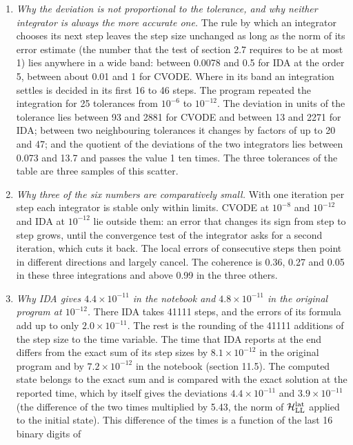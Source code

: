 \documentclass[
  10pt,
]{article}
\begin{document}
\begin{enumerate}
\item
  \emph{Why the deviation is not proportional to the tolerance, and why
  neither integrator is always the more accurate one.} The rule by which
  an integrator chooses its next step leaves the step size unchanged as
  long as the norm of its error estimate (the number that the test of
  section 2.7 requires to be at most 1) lies anywhere in a wide band:
  between 0.0078 and 0.5 for IDA at the order 5, between about 0.01 and
  1 for CVODE. Where in its band an integration settles is decided in
  its first 16 to 46 steps. The program repeated the integration for 25
  tolerances from \(10^{-6}\) to \(10^{-12}\). The deviation in units of
  the tolerance lies between 93 and 2881 for CVODE and between 13 and
  2271 for IDA; between two neighbouring tolerances it changes by
  factors of up to 20 and 47; and the quotient of the deviations of the
  two integrators lies between 0.073 and 13.7 and passes the value 1 ten
  times. The three tolerances of the table are three samples of this
  scatter.
\item
  \emph{Why three of the six numbers are comparatively small.} With one
  iteration per step each integrator is stable only within limits. CVODE
  at \(10^{-8}\) and \(10^{-12}\) and IDA at \(10^{-12}\) lie outside
  them: an error that changes its sign from step to step grows, until
  the convergence test of the integrator asks for a second iteration,
  which cuts it back. The local errors of consecutive steps then point
  in different directions and largely cancel. The coherence is 0.36,
  0.27 and 0.05 in these three integrations and above 0.99 in the three
  others.
\item
  \emph{Why IDA gives \(4.4\times10^{-11}\) in the notebook and
  \(4.8\times10^{-11}\) in the original program at \(10^{-12}\).} There
  IDA takes 41111 steps, and the errors of its formula add up to only
  \(2.0\times10^{-11}\). The rest is the rounding of the 41111 additions
  of the step size to the time variable. The time that IDA reports at
  the end differs from the exact sum of its step sizes by
  \(8.1\times10^{-12}\) in the original program and by
  \(7.2\times10^{-12}\) in the notebook (section 11.5). The computed
  state belongs to the exact sum and is compared with the exact solution
  at the reported time, which by itself gives the deviations
  \(4.4\times10^{-11}\) and \(3.9\times10^{-11}\) (the difference of the
  two times multiplied by 5.43, the norm of
  \(\mathcal H^{\rm lat}_{\rm LL}\) applied to the initial state). This
  difference of the times is a function of the last 16 binary digits of

\end{enumerate}
\end{document}
